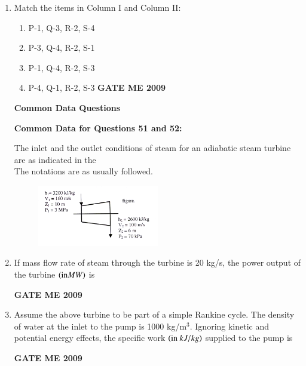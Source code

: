 \documentclass[journal]{IEEEtran}
\begin{document}
\begin{enumerate}[leftmargin=0pt]
\item Match the items in Column I and Column II:\\
\begin{table}[h]
    \centering
    
   
\end{table}
\begin{enumerate}
  \item P-1, Q-3, R-2, S-4
  \item P-3, Q-4, R-2, S-1
  \item P-1, Q-4, R-2, S-3
  \item P-4, Q-1, R-2, S-3
  \hfill{\textbf{GATE ME 2009}}
\end{enumerate}

\textbf{Common Data Questions}

\textbf{Common Data for Questions 51 and 52:}

The inlet and the outlet conditions of steam for an adiabatic steam turbine are as indicated in the\\
The notations are as usually followed.
\begin{figure}[h]
  \centering
  \includegraphics[width=0.5\textwidth]{Figs/image (11).png}
  \caption{}
\end{figure}

\item If mass flow rate of steam through the turbine is 20 kg/s, the power output of the turbine $\left(\text{in} MW\right)$ is
\begin{enumerate}
\hfill{\textbf{GATE ME 2009}}
\end{enumerate}

\item Assume the above turbine to be part of a simple Rankine cycle. The density of water at the inlet to the pump is 1000 kg/m$^3$. Ignoring kinetic and potential energy effects, the specific work $\left(\text{in} \  kJ/kg\right)$ supplied to the pump is
\begin{enumerate}
\hfill{\textbf{GATE ME 2009}}
\end{enumerate}


\end{enumerate}
\end{document}
